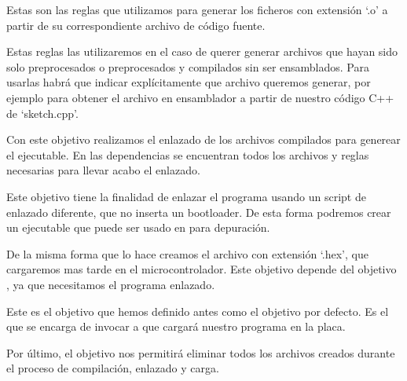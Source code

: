  
 Estas son las reglas que utilizamos para generar los ficheros con extensión `.o' a partir de su correspondiente archivo de código fuente.
 
 
 Estas reglas las utilizaremos en el caso de querer generar archivos que hayan sido solo preprocesados o preprocesados y compilados sin ser ensamblados. Para usarlas habrá que indicar explícitamente que archivo queremos generar, por ejemplo  para obtener el archivo en ensamblador a partir de nuestro código C++ de `sketch.cpp'.
 
 
 Con este objetivo realizamos el enlazado de los archivos compilados para generear el ejecutable. En las dependencias se encuentran todos los archivos y reglas necesarias para llevar acabo el enlazado.
 
 
 Este objetivo tiene la finalidad de enlazar el programa usando un script de enlazado diferente, que no inserta un bootloader. De esta forma podremos crear un ejecutable que puede ser usado en  para depuración.
 
 
 De la misma forma que lo hace  creamos el archivo con extensión `.hex', que cargaremos mas tarde en el microcontrolador. Este objetivo depende del objetivo , ya que necesitamos el programa enlazado.
 
 
 Este es el objetivo que hemos definido antes como el objetivo por defecto. Es el que se encarga de invocar a  que cargará nuestro programa en la placa.
 
 
 Por último, el objetivo  nos permitirá eliminar todos los archivos creados durante el proceso de compilación, enlazado y carga.
